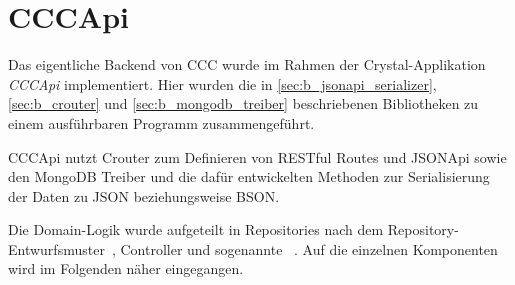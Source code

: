 \section{CCCApi}
\label{sec:b_cccapi}

Das eigentliche Backend von CCC wurde im Rahmen der Crystal-Applikation
\emph{CCCApi} implementiert.  Hier wurden die in
\cref{sec:b_jsonapi_serializer}, \ref{sec:b_crouter} und
\ref{sec:b_mongodb_treiber} beschriebenen Bibliotheken zu einem ausführbaren
Programm zusammengeführt.

CCCApi nutzt Crouter zum Definieren von RESTful Routes und JSONApi sowie den
MongoDB Treiber und die dafür entwickelten Methoden zur Serialisierung der
Daten zu JSON beziehungsweise BSON.

Die Domain-Logik wurde aufgeteilt in Repositories nach dem
Repository-Ent\-wurfs\-mus\-ter~\cite{repository-pattern}, Controller und
sogenannte ~\cite{service-objects}.  Auf die
einzelnen Komponenten wird im Folgenden näher eingegangen.




